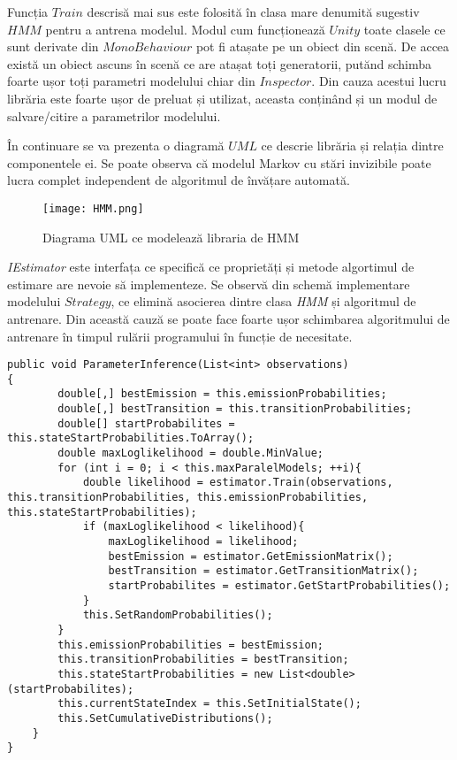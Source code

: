 Funcția $Train$ descrisă mai sus este folosită în clasa mare denumită sugestiv $HMM$ pentru a antrena modelul. Modul cum funcționează $Unity$ toate clasele ce sunt derivate din $MonoBehaviour$ pot fi atașate pe un obiect din scenă. De accea există un obiect ascuns în scenă ce are atașat toți generatorii, putănd schimba foarte ușor toți parametri modelului chiar din $Inspector$. Din cauza acestui lucru librăria este foarte ușor de preluat și utilizat, aceasta conținând și un modul de salvare/citire a parametrilor modelului.\par

În continuare se va prezenta o diagramă $UML$ ce descrie librăria și relația dintre componentele ei. Se poate observa că modelul Markov cu stări invizibile poate lucra complet independent de algoritmul de învățare automată.\par

\vspace{10mm}
\begin{figure}[H]
\centering
\texttt{[image: HMM.png]} \par
\caption{Diagrama UML ce modelează libraria de HMM}
\end{figure}

\textit{IEstimator} este interfața ce specifică ce proprietăți și metode algortimul de estimare are nevoie să implementeze. Se observă din schemă implementare modelului $Strategy$, ce elimină asocierea dintre clasa \textit{HMM} și algoritmul de antrenare. Din această cauză se poate face foarte ușor schimbarea algoritmului de antrenare în timpul rulării programului în funcție de necesitate.\par

\begin{lstlisting}[caption=Folosirea funcție $Train$ în cadrul modelului]
public void ParameterInference(List<int> observations)
{
        double[,] bestEmission = this.emissionProbabilities;
        double[,] bestTransition = this.transitionProbabilities;
        double[] startProbabilites = this.stateStartProbabilities.ToArray();
        double maxLoglikelihood = double.MinValue;
        for (int i = 0; i < this.maxParalelModels; ++i){
            double likelihood = estimator.Train(observations, this.transitionProbabilities, this.emissionProbabilities, this.stateStartProbabilities);
            if (maxLoglikelihood < likelihood){
                maxLoglikelihood = likelihood;
                bestEmission = estimator.GetEmissionMatrix();
                bestTransition = estimator.GetTransitionMatrix();
                startProbabilites = estimator.GetStartProbabilities();
            }
            this.SetRandomProbabilities();
        }
        this.emissionProbabilities = bestEmission;
        this.transitionProbabilities = bestTransition;
        this.stateStartProbabilities = new List<double>(startProbabilites);
        this.currentStateIndex = this.SetInitialState();
        this.SetCumulativeDistributions();
    }
}
\end{lstlisting}

